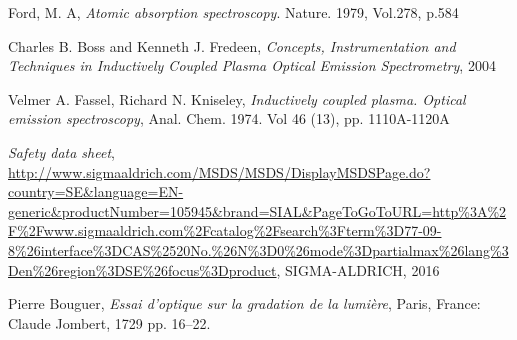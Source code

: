 \documentclass[11pt]{article}
\begin{document}
\begin{thebibliography}{9}
        Ford, M. A,
        \emph{Atomic absorption spectroscopy}.
        Nature. 1979, Vol.278, p.584
    
        Charles B. Boss and Kenneth J. Fredeen,
        \emph{Concepts, Instrumentation and Techniques in Inductively Coupled Plasma Optical Emission Spectrometry},
        2004
        
        Velmer A. Fassel, Richard N. Kniseley,
        \emph{Inductively coupled plasma. Optical emission spectroscopy},
        Anal. Chem. 1974. Vol 46 (13), pp. 1110A-1120A

        \emph{Safety data sheet},
\url{http://www.sigmaaldrich.com/MSDS/MSDS/DisplayMSDSPage.do?country=SE&language=EN-generic&productNumber=105945&brand=SIAL&PageToGoToURL=http%3A%2F%2Fwww.sigmaaldrich.com%2Fcatalog%2Fsearch%3Fterm%3D77-09-8%26interface%3DCAS%2520No.%26N%3D0%26mode%3Dpartialmax%26lang%3Den%26region%3DSE%26focus%3Dproduct},
    SIGMA-ALDRICH, 2016
    
        Pierre Bouguer,
        \emph{Essai d'optique sur la gradation de la lumière},
        Paris, France: Claude Jombert, 1729 pp. 16–22.
    
    

\end{thebibliography}
\clearpage

\appendix

\end{document}
